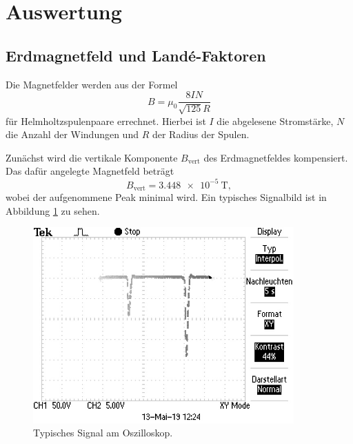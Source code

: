 \newpage
\section{Auswertung}
\label{sec:Auswertung}
\subsection{Erdmagnetfeld und Landé-Faktoren}
\label{sec:lande}

\FloatBarrier
Die Magnetfelder werden aus der Formel
\begin{equation}
B=\mu_0\frac{8 I N}{\sqrt{125}R}
\end{equation}
für Helmholtzspulenpaare errechnet.
Hierbei ist $I$ die abgelesene Stromstärke, $N$ die Anzahl der Windungen und $R$ der Radius der Spulen.

Zunächst wird die vertikale Komponente $B_{\text{vert}}$ des Erdmagnetfeldes kompensiert.
Das dafür angelegte Magnetfeld beträgt
\begin{equation}
B_{\text{vert}}=\SI{3.448e-5}{\tesla},
\end{equation}
wobei der aufgenommene Peak minimal wird.
Ein typisches Signalbild ist in Abbildung \ref{fig:Signal} zu sehen.
 \begin{figure}
   \centering
   \includegraphics[width=10cm]{pictures/TEK0008.JPG}
   \caption{Typisches Signal am Oszilloskop.}
   \label{fig:Signal}
 \end{figure}
 \FloatBarrier

